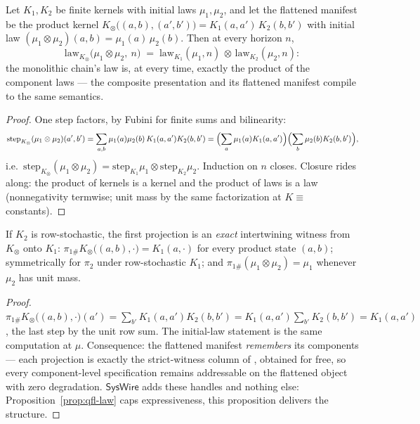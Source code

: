 \begin{bprop}\label{prop:qfl-law}
Let $K_1, K_2$ be finite kernels with initial laws $\mu_1, \mu_2$, and
let the flattened manifest be the product kernel
$K_{\otimes}\bigl((a,b), (a',b')\bigr) = K_1(a, a')\, K_2(b, b')$ with
initial law $(\mu_1 \otimes \mu_2)(a, b) = \mu_1(a)\, \mu_2(b)$. Then
at every horizon $n$,
\[
\mathrm{law}_{K_\otimes}\bigl(\mu_1 \otimes \mu_2,\ n\bigr)
\;=\; \mathrm{law}_{K_1}(\mu_1, n) \,\otimes\, \mathrm{law}_{K_2}(\mu_2, n):
\]
the monolithic chain's law is, at every time, exactly the product of
the component laws --- the composite presentation and its flattened
manifest compile to the same semantics.
\end{bprop}
\begin{proof}
One step factors, by Fubini for finite sums and bilinearity:
\[
\mathrm{step}_{K_\otimes}(\mu_1 \otimes \mu_2)(a', b')
= \sum_{a, b} \mu_1(a) \mu_2(b)\, K_1(a, a') K_2(b, b')
= \Bigl(\sum_a \mu_1(a) K_1(a, a')\Bigr)\Bigl(\sum_b \mu_2(b) K_2(b, b')\Bigr),
\]
i.e.\ $\mathrm{step}_{K_\otimes}(\mu_1 \otimes \mu_2) =
\mathrm{step}_{K_1}\mu_1 \otimes \mathrm{step}_{K_2}\mu_2$. Induction
on $n$ closes. Closure rides along: the product of kernels is a kernel
and the product of laws is a law (nonnegativity termwise; unit mass by
the same factorization at $K \equiv$ constants).
\end{proof}

\begin{bprop}\label{prop:qfl-proj}
If $K_2$ is row-stochastic, the first projection is an \emph{exact}
intertwining witness from $K_\otimes$ onto $K_1$:
$\pi_{1\#} K_\otimes\bigl((a,b), \cdot\bigr) = K_1(a, \cdot)$ for every
product state $(a, b)$; symmetrically for $\pi_2$ under
row-stochastic $K_1$; and $\pi_{1\#}(\mu_1 \otimes \mu_2) = \mu_1$
whenever $\mu_2$ has unit mass.
\end{bprop}
\begin{proof}
$\pi_{1\#} K_\otimes\bigl((a,b), \cdot\bigr)(a') =
\sum_{b'} K_1(a, a') K_2(b, b') = K_1(a, a') \sum_{b'} K_2(b, b') =
K_1(a, a')$, the last step by the unit row sum. The initial-law
statement is the same computation at $\mu$. Consequence: the flattened
manifest \emph{remembers} its components --- each projection is exactly
the strict-witness column of , obtained for
free, so every component-level specification remains addressable on the
flattened object with zero degradation. $\mathsf{SysWire}$ adds these
handles and nothing else: Proposition~\ref{prop:qfl-law} caps
expressiveness, this proposition delivers the structure.
\end{proof}


